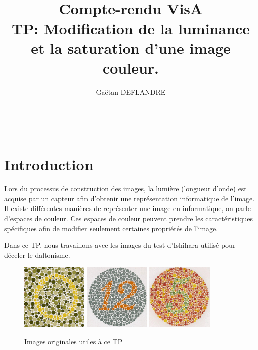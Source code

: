 \documentclass[a4paper,11pt]{article}
\title{
  \noindent\hrulefill \\
  \vspace{10mm}
  \textbf{Compte-rendu VisA} \\
  \vspace{5mm}
  TP: Modification de la luminance et la saturation d'une image couleur.
}
\author{Gaëtan DEFLANDRE}
\begin{document}
\maketitle
\noindent\hrulefill \\


\section*{Introduction}

Lors du processus de construction des images, la lumière (longueur 
d'onde) est acquise par un capteur afin d'obtenir une représentation 
informatique de l'image. Il existe différentes manières de représenter 
une image en informatique, on parle d'espaces de couleur. Ces espaces 
de couleur peuvent prendre les caractéristiques spécifiques afin 
de modifier seulement certaines propriétés de l'image.   

\newpage

Dans ce TP, nous travaillons avec les images du test d'Ishihara utilisé 
pour déceler le daltonisme.

\begin{figure}[H]
  \begin{center}
    \includegraphics[width=120px]{images/it1_72pp.png}
    \includegraphics[width=120px]{images/it2_72pp.png}
    \includegraphics[width=120px]{images/it3_72pp.png}
    \caption{Images originales utiles à ce TP}
  \end{center}
\end{figure}
\end{document}
